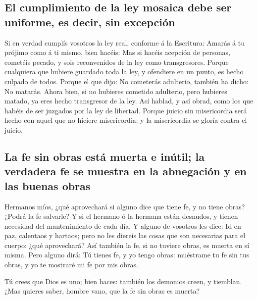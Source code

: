 \hypertarget{el-cumplimiento-de-la-ley-mosaica-debe-ser-uniforme-es-decir-sin-excepciuxf3n}{%
\subsection{El cumplimiento de la ley mosaica debe ser uniforme, es
decir, sin
excepción}\label{el-cumplimiento-de-la-ley-mosaica-debe-ser-uniforme-es-decir-sin-excepciuxf3n}}

 Si en verdad cumplís vosotros la ley real, conforme á la
Escritura: Amarás á tu prójimo como á ti mismo, bien hacéis:
 Mas si hacéis acepción de personas, cometéis pecado, y sois
reconvenidos de la ley como transgresores.  Porque
cualquiera que hubiere guardado toda la ley, y ofendiere en un punto, es
hecho culpado de todos.  Porque el que dijo: No cometerás
adulterio, también ha dicho: No matarás. Ahora bien, si no hubieres
cometido adulterio, pero hubieres matado, ya eres hecho transgresor de
la ley.  Así hablad, y así obrad, como los que habéis de
ser juzgados por la ley de libertad.  Porque juicio sin
misericordia será hecho con aquel que no hiciere misericordia: y la
misericordia se gloría contra el juicio.

\hypertarget{la-fe-sin-obras-estuxe1-muerta-e-inuxfatil-la-verdadera-fe-se-muestra-en-la-abnegaciuxf3n-y-en-las-buenas-obras}{%
\subsection{La fe sin obras está muerta e inútil; la verdadera fe se
muestra en la abnegación y en las buenas
obras}\label{la-fe-sin-obras-estuxe1-muerta-e-inuxfatil-la-verdadera-fe-se-muestra-en-la-abnegaciuxf3n-y-en-las-buenas-obras}}

 Hermanos míos, ¿qué aprovechará si alguno dice que tiene
fe, y no tiene obras? ¿Podrá la fe salvarle?  Y si el
hermano ó la hermana están desnudos, y tienen necesidad del
mantenimiento de cada día,  Y alguno de vosotros les dice:
Id en paz, calentaos y hartaos; pero no les diereis las cosas que son
necesarias para el cuerpo: ¿qué aprovechará?  Así también
la fe, si no tuviere obras, es muerta en sí misma.  Pero
alguno dirá: Tú tienes fe, y yo tengo obras: muéstrame tu fe sin tus
obras, y yo te mostraré mi fe por mis obras.

 Tú crees que Dios es uno; bien haces: también los demonios
creen, y tiemblan.  ¿Mas quieres saber, hombre vano, que la
fe sin obras es muerta?

